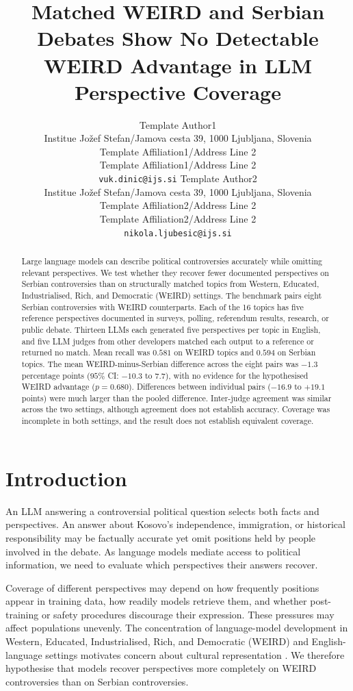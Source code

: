\documentclass[11pt,a4paper]{article}
\title{Matched WEIRD and Serbian Debates Show No Detectable WEIRD Advantage in LLM Perspective Coverage}
\author{
  Template Author1\Thanks{The {\em actual} contributors to this instruction
    document and corresponding template file are given in Section
    \ref{sec:contributors}.} 
  \\
  Institue Jožef Stefan/Jamova cesta 39, 1000 Ljubljana, Slovenia
  \\
  Template Affiliation1/Address Line 2
  \\
  Template Affiliation1/Address Line 2
  \\
  \texttt{vuk.dinic@ijs.si}
  \And
  Template Author2 
  \\
  Institue Jožef Stefan/Jamova cesta 39, 1000 Ljubljana, Slovenia
  \\
  Template Affiliation2/Address Line 2
  \\
  Template Affiliation2/Address Line 2
  \\
  \texttt{nikola.ljubesic@ijs.si}
}
\date{}
\begin{document}
\maketitle
\begin{abstract}
Large language models can describe political controversies accurately while omitting relevant perspectives. We test whether they recover fewer documented perspectives on Serbian controversies than on structurally matched topics from Western, Educated, Industrialised, Rich, and Democratic (WEIRD) settings. The benchmark pairs eight Serbian controversies with WEIRD counterparts. Each of the 16 topics has five reference perspectives documented in surveys, polling, referendum results, research, or public debate. Thirteen LLMs each generated five perspectives per topic in English, and five LLM judges from other developers matched each output to a reference or returned no match. Mean recall was $0.581$ on WEIRD topics and $0.594$ on Serbian topics. The mean WEIRD-minus-Serbian difference across the eight pairs was $-1.3$ percentage points ($95\%$ CI: $-10.3$ to $7.7$), with no evidence for the hypothesised WEIRD advantage ($p=0.680$). Differences between individual pairs ($-16.9$ to $+19.1$ points) were much larger than the pooled difference. Inter-judge agreement was similar across the two settings, although agreement does not establish accuracy. Coverage was incomplete in both settings, and the result does not establish equivalent coverage.
\end{abstract}

\section{Introduction}
\label{sec:Introduction}
An LLM answering a controversial political question selects both facts and perspectives. An answer about Kosovo's independence, immigration, or historical responsibility may be factually accurate yet omit positions held by people involved in the debate. As language models mediate access to political information, we need to evaluate which perspectives their answers recover.

Coverage of different perspectives may depend on how frequently positions appear in training data, how readily models retrieve them, and whether post-training or safety procedures discourage their expression. These pressures may affect populations unevenly. The concentration of language-model development in Western, Educated, Industrialised, Rich, and Democratic (WEIRD) \citep{henrich2010weirdest} and English-language settings motivates concern about cultural representation \cite{sorensenRoadmapPluralisticAlignment2024, fengModularPluralismPluralistic2024, wangMultilingualPromptingImproving2025, zewailMoralStereotypingLarge2026}. We therefore hypothesise that models recover perspectives more completely on WEIRD controversies than on Serbian controversies.
\end{document}
